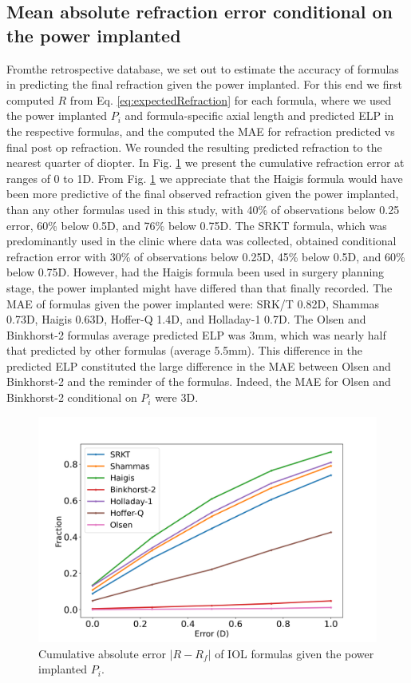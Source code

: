 \documentclass[article,twocolumn,preprint,10pt]{paper}%
\renewcommand{\(}{\left(}
\renewcommand{\)}{\right)}
\renewcommand{\[}{\left[}
\renewcommand{\]}{\right]}
\newcommand{\1}{\mbox{\boldmath$1$}}
\begin{document}
\subsection{ Mean absolute refraction  error conditional on the power implanted}
Fromthe retrospective database, we set out to estimate the accuracy of formulas in predicting the final refraction given the power implanted. For this end we first computed $R$ from Eq. \ref{eq:expectedRefraction} for each formula, where we used the power implanted $P_i$  and formula-specific axial length and predicted ELP in the respective formulas, and the computed the MAE for refraction predicted vs final post op refraction. We rounded the resulting predicted refraction to the nearest quarter of diopter. In Fig. \ref{fig:cumulativeRefractionError_powerImplanted} we present the cumulative refraction error at ranges of 0 to 1D. From Fig. \ref{fig:cumulativeRefractionError_powerImplanted} we appreciate that the Haigis formula would have been more predictive of the final observed refraction given the power implanted, than any other formulas used in this study, with 40\% of observations below 0.25 error, 60\% below 0.5D, and 76\% below 0.75D. The SRKT formula,  which was predominantly used in the clinic where data was collected, obtained conditional refraction error with 30\% of observations below 0.25D, 45\% below 0.5D, and 60\% below 0.75D. However, had the Haigis formula  been used in surgery planning stage, the power implanted might have differed than that finally recorded. 
The MAE of formulas given the power implanted were: SRK/T 0.82D, Shammas 0.73D, Haigis 0.63D, Hoffer-Q 1.4D, and Holladay-1 0.7D. The Olsen and Binkhorst-2 formulas average predicted ELP was 3mm, which was nearly half that predicted by other formulas (average 5.5mm). This difference in the predicted ELP constituted the large difference in the MAE between Olsen and Binkhorst-2 and the reminder of the formulas. Indeed, the MAE for Olsen and Binkhorst-2 conditional on $P_i$ were 3D. 

\begin{figure}
	\includegraphics[width=1\linewidth]{cumulativeAbsoluteErrorFormulas_implantedPower}
	\caption{Cumulative absolute error $|R-R_f|$ of IOL formulas given the power implanted $P_i$.}
	\label{fig:cumulativeRefractionError_powerImplanted}
	\end{figure}
\end{document}
